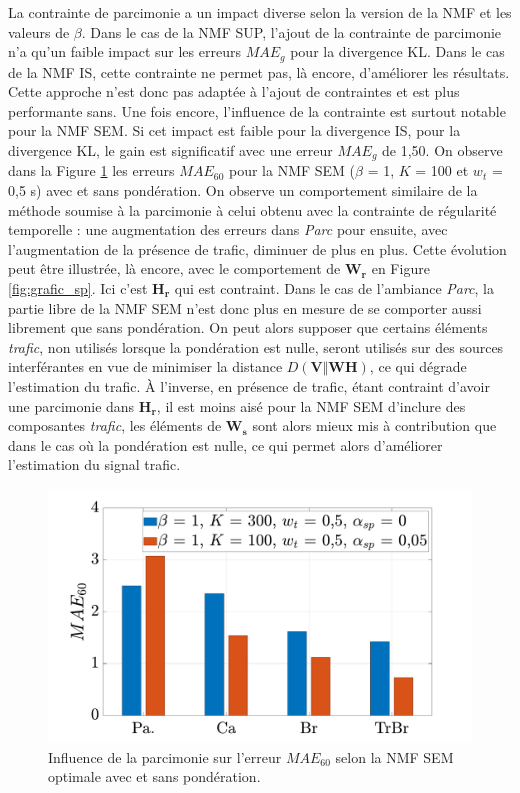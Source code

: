 La contrainte de parcimonie a un impact diverse selon la version de la NMF et les valeurs de $\beta$. Dans le cas de la NMF SUP, l'ajout de la contrainte de parcimonie n'a qu'un faible impact sur les erreurs $MAE_g$ pour la divergence KL.  Dans le cas de la NMF IS, cette contrainte ne permet pas, là encore, d'améliorer les résultats. Cette approche n'est donc pas adaptée à l'ajout de contraintes et est plus performante sans.
Une fois encore, l'influence de la contrainte est surtout notable pour la NMF SEM. Si cet impact est faible pour la divergence IS, pour la divergence KL, le gain est significatif avec une erreur $MAE_g$ de 1,50. On observe dans la Figure  \ref{fig:erreurSparseDetails} les erreurs $MAE_{60}$ pour la NMF SEM ($\beta$ = 1, $K$ = 100 et $w_t$ = 0,5 s) avec et sans pondération. On observe un comportement similaire de la méthode soumise à la parcimonie à celui obtenu avec la contrainte de régularité temporelle : une augmentation des erreurs dans \textit{Parc} pour ensuite, avec l'augmentation de la présence de trafic, diminuer de plus en plus. Cette évolution peut être illustrée, là encore, avec le comportement de $\mathbf{W_r}$ en Figure \ref{fig:grafic_sp}. Ici c'est $\mathbf{H_r}$ qui est contraint. Dans le cas de l'ambiance \textit{Parc}, la partie libre de la NMF SEM n'est donc plus en mesure de se comporter aussi librement que sans pondération. On peut alors supposer que certains éléments \textit{trafic}, non utilisés lorsque la pondération est nulle, seront utilisés sur des sources interférantes en vue de minimiser la distance $D(\mathbf{V}\Vert \mathbf{WH})$, ce qui dégrade l'estimation du trafic.
\`A l'inverse, en présence de trafic, étant contraint d'avoir une parcimonie dans $\mathbf{H_r}$, il est moins aisé pour la NMF SEM d'inclure des composantes \textit{trafic}, les éléments de $\mathbf{W_s}$ sont alors mieux mis à contribution que dans le cas où la pondération est nulle, ce qui permet alors d'améliorer l'estimation du signal trafic.

\begin{figure}[h]
\centering
\includegraphics[width=.7\linewidth]{./figures/resultats/bar_sparse.pdf}
\caption{Influence de la parcimonie sur l'erreur $MAE_{60}$ selon la NMF SEM optimale avec et sans pondération.}
\label{fig:erreurSparseDetails}
\end{figure}

